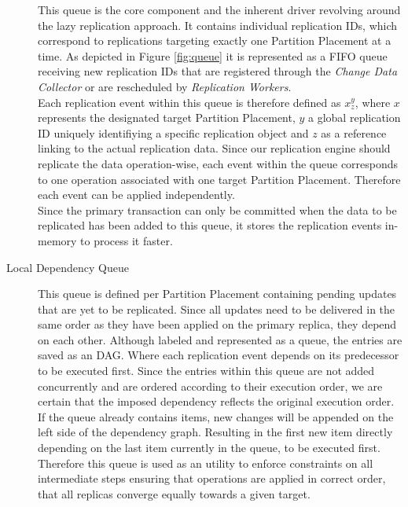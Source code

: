 \begin{description}
    This queue is the core component and the inherent driver revolving around the lazy replication approach. 
    It contains individual replication IDs, which correspond to replications targeting exactly one Partition Placement at a time.
    As depicted in Figure \ref{fig:queue} it is represented as a FIFO queue receiving new replication IDs that are registered through the \emph{Change Data Collector} 
    or are rescheduled by \emph{Replication Workers}.\\
    Each replication event within this queue is therefore defined as $x_{z}^y$, where $x$ represents the designated target Partition Placement, $y$ a global
    replication ID uniquely identifiying a specific replication object and $z$ as a reference linking to the actual replication data. 
    Since our replication engine should replicate the data operation-wise, each event within the queue corresponds to one operation associated with one target Partition Placement.
    Therefore each event can be applied independently.\\Since the primary transaction can only be committed when the data to be replicated has been added to this queue,
    it stores the replication events in-memory to process it faster.

  
    \item[Local Dependency Queue] This queue is defined per Partition Placement containing pending updates that are yet to be replicated. 
    Since all updates need to be delivered in the same order as they have been applied on the primary replica, they depend on each other. 
    Although labeled and represented as a queue, the entries are saved as an DAG. Where each replication event depends on its predecessor to be executed first.
    Since the entries within this queue are not added concurrently and are ordered according to their execution order, we are certain that the imposed dependency
    reflects the original execution order. If the queue already contains items, new changes will be appended on the left side of the dependency graph. 
    Resulting in the first new item directly depending on the last item currently in the queue, to be executed first. 
    Therefore this queue is used as an utility to enforce constraints on all intermediate steps ensuring that operations are applied 
    in correct order, that all replicas converge equally towards a given target. 



\end{description}

